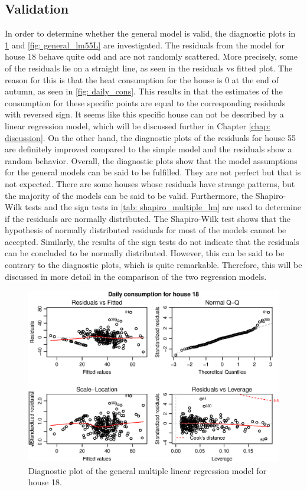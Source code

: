 \subsection{Validation}
In order to determine whether the general model is valid, the diagnostic plots in \cref{fig: general_lm18L} and \cref{fig: general_lm55L} are investigated. The residuals from the model for house 18 behave quite odd and are not randomly scattered. More precisely, some of the residuals lie on a straight line, as seen in the residuals vs fitted plot. The reason for this is that the heat consumption for the house is 0 at the end of autumn, as seen in \cref{fig: daily_cons}. This results in that the estimates of the consumption for these specific points are equal to the corresponding residuals with reversed sign. It seems like this specific house can not be described by a linear regression model, which will be discussed further in Chapter \ref{chap: discussion}. On the other hand, the diagnostic plots of the residuals for house 55 are definitely improved compared to the simple model and the residuals show a random behavior. Overall, the diagnostic plots show that the model assumptions for the general models can be said to be fulfilled. They are not perfect but that is not expected. There are some houses whose residuals have strange patterns, but the majority of the models can be said to be valid. Furthermore, the Shapiro-Wilk tests and the sign tests in \cref{tab: shapiro_multiple_lm} are used to determine if the residuals are normally distributed. The Shapiro-Wilk test shows that the hypothesis of normally distributed residuals for most of the models cannot be accepted. Similarly, the results of the sign tests do not indicate that the residuals can be concluded to be normally distributed. However, this can be said to be contrary to the diagnostic plots, which is quite remarkable. Therefore, this will be discussed in more detail in the comparison of the two regression models.
\begin{figure}[ht]
    \centering
    \includegraphics[width=1.\textwidth]{../../../figures/general_lm18L.eps}
    \caption{Diagnostic plot of the general multiple linear regression model for house 18. }
    \label{fig: general_lm18L}
\end{figure}

